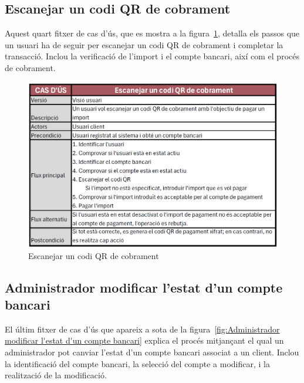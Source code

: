 \documentclass[a4paper,12pt,twoside]{ThesisStyle}
\begin{document}
\clearpage


\subsection{Escanejar un codi QR de cobrament}
\label{subsec:Escanejar un codi QR de cobrament}

Aquest quart fitxer de cas d'ús, que es mostra a la figura~\ref{fig:Escanejar un codi QR de cobrament}, detalla els passos que un usuari ha de seguir per escanejar un codi QR de cobrament i completar la transacció. Inclou la verificació de l’import i el compte bancari, així com el procés de cobrament.

\begin{figure}[h]
    \centering
    \includegraphics[width=1\textwidth]{imatges/f4.png}
    \caption{Escanejar un codi QR de cobrament}
    \label{fig:Escanejar un codi QR de cobrament}
\end{figure}


\clearpage
\subsection{Administrador modificar l'estat d'un compte bancari}
\label{subsec:Administrador modificar l'estat d'un compte bancari}

El últim fitxer de cas d'ús que apareix a sota de la figura~\ref{fig:Administrador modificar l'estat d'un compte bancari} explica el procés mitjançant el qual un administrador pot canviar l'estat d'un compte bancari associat a un client. Inclou la identificació del compte bancari, la selecció del compte a modificar, i la realització de la modificació.
\end{document}
